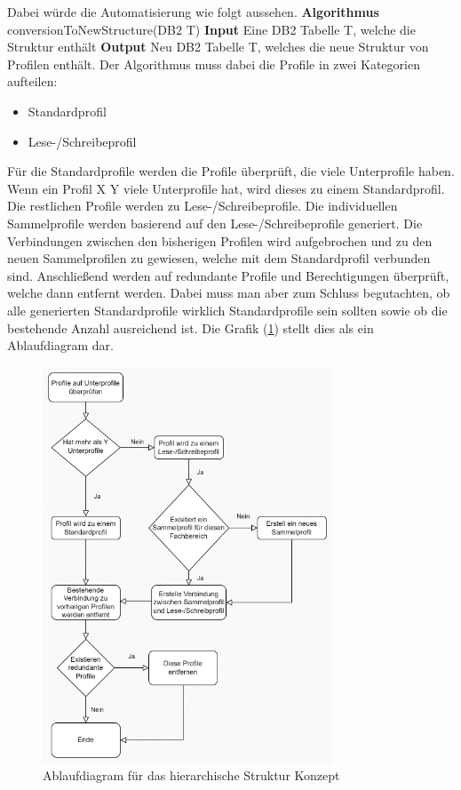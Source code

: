 Dabei würde die Automatisierung wie folgt aussehen.
\newline
\newline
\textbf{Algorithmus} conversionToNewStructure(DB$2$ T)
\newline
\newline
\textbf{Input} Eine DB2 Tabelle T, welche die Struktur enthält
\newline
\newline
\textbf{Output} Neu DB2 Tabelle T, welches die neue Struktur von Profilen enthält.
\newline
\newline
Der Algorithmus muss dabei die Profile in zwei Kategorien aufteilen:
\begin{itemize}
	\item Standardprofil
	\item Lese-/Schreibeprofil
\end{itemize}
Für die Standardprofile werden die Profile überprüft, die viele Unterprofile haben.
Wenn ein Profil X Y viele Unterprofile hat, wird dieses zu einem Standardprofil.
Die restlichen Profile werden zu Lese-/Schreibeprofile.
Die individuellen Sammelprofile werden basierend auf den Lese-/Schreibeprofile generiert.
Die Verbindungen zwischen den bisherigen Profilen wird aufgebrochen und zu den neuen Sammelprofilen zu gewiesen, welche mit dem Standardprofil verbunden sind.
Anschließend werden auf redundante Profile und Berechtigungen überprüft, welche dann entfernt werden.
Dabei muss man aber zum Schluss begutachten, ob alle generierten Standardprofile wirklich Standardprofile sein sollten sowie ob die bestehende Anzahl ausreichend ist.
Die Grafik (\ref{fig:Hier}) stellt dies als ein Ablaufdiagram dar.
\begin{figure}[h!]
 \centering
 \includegraphics[width=0.77\textwidth]{gfx/Picture/Hier.PNG}
 \caption{Ablaufdiagram für das hierarchische Struktur Konzept}
 \label{fig:Hier}
\end{figure}

